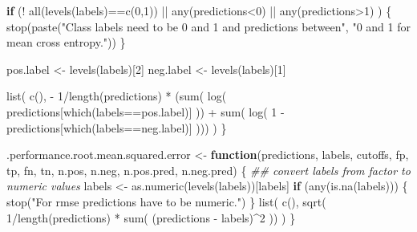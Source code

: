 \documentclass[
  letterpaper,
  DIV=11,
  numbers=noendperiod]{scrartcl}
\newenvironment{Shaded}{\begin{snugshade}}{\end{snugshade}}
\newcommand{\ControlFlowTok}[1]{\textcolor[rgb]{0.00,0.23,0.31}{\textbf{#1}}}
\newcommand{\DecValTok}[1]{\textcolor[rgb]{0.68,0.00,0.00}{#1}}
\newcommand{\DocumentationTok}[1]{\textcolor[rgb]{0.37,0.37,0.37}{\textit{#1}}}
\newcommand{\FunctionTok}[1]{\textcolor[rgb]{0.28,0.35,0.67}{#1}}
\newcommand{\NormalTok}[1]{\textcolor[rgb]{0.00,0.23,0.31}{#1}}
\newcommand{\OtherTok}[1]{\textcolor[rgb]{0.00,0.23,0.31}{#1}}
\newcommand{\SpecialCharTok}[1]{\textcolor[rgb]{0.37,0.37,0.37}{#1}}
\newcommand{\StringTok}[1]{\textcolor[rgb]{0.13,0.47,0.30}{#1}}
\begin{document}
\begin{Shaded}
\begin{Highlighting}[]
      \ControlFlowTok{if}\NormalTok{ (}\SpecialCharTok{!} \FunctionTok{all}\NormalTok{(}\FunctionTok{levels}\NormalTok{(labels)}\SpecialCharTok{==}\FunctionTok{c}\NormalTok{(}\DecValTok{0}\NormalTok{,}\DecValTok{1}\NormalTok{)) }\SpecialCharTok{||}
          \FunctionTok{any}\NormalTok{(predictions}\SpecialCharTok{\textless{}}\DecValTok{0}\NormalTok{) }\SpecialCharTok{||} \FunctionTok{any}\NormalTok{(predictions}\SpecialCharTok{\textgreater{}}\DecValTok{1}\NormalTok{) ) \{}
          \FunctionTok{stop}\NormalTok{(}\FunctionTok{paste}\NormalTok{(}\StringTok{"Class labels need to be 0 and 1 and predictions between"}\NormalTok{,}
                     \StringTok{"0 and 1 for mean cross entropy."}\NormalTok{))}
\NormalTok{      \}}
      
\NormalTok{      pos.label }\OtherTok{\textless{}{-}} \FunctionTok{levels}\NormalTok{(labels)[}\DecValTok{2}\NormalTok{]}
\NormalTok{      neg.label }\OtherTok{\textless{}{-}} \FunctionTok{levels}\NormalTok{(labels)[}\DecValTok{1}\NormalTok{]}
    
      \FunctionTok{list}\NormalTok{( }\FunctionTok{c}\NormalTok{(), }\SpecialCharTok{{-}} \DecValTok{1}\SpecialCharTok{/}\FunctionTok{length}\NormalTok{(predictions) }\SpecialCharTok{*}
\NormalTok{           (}\FunctionTok{sum}\NormalTok{( }\FunctionTok{log}\NormalTok{( predictions[}\FunctionTok{which}\NormalTok{(labels}\SpecialCharTok{==}\NormalTok{pos.label)] ))  }\SpecialCharTok{+}
            \FunctionTok{sum}\NormalTok{( }\FunctionTok{log}\NormalTok{( }\DecValTok{1} \SpecialCharTok{{-}}\NormalTok{ predictions[}\FunctionTok{which}\NormalTok{(labels}\SpecialCharTok{==}\NormalTok{neg.label)] ))) )}
\NormalTok{  \}}


\NormalTok{.performance.root.mean.squared.error }\OtherTok{\textless{}{-}}
  \ControlFlowTok{function}\NormalTok{(predictions, labels, cutoffs, fp, tp, fn, tn,}
\NormalTok{           n.pos, n.neg, n.pos.pred, n.neg.pred) \{}
      \DocumentationTok{\#\# convert labels from factor to numeric values}
\NormalTok{      labels }\OtherTok{\textless{}{-}} \FunctionTok{as.numeric}\NormalTok{(}\FunctionTok{levels}\NormalTok{(labels))[labels]}
      \ControlFlowTok{if}\NormalTok{ (}\FunctionTok{any}\NormalTok{(}\FunctionTok{is.na}\NormalTok{(labels))) \{}
          \FunctionTok{stop}\NormalTok{(}\StringTok{"For rmse predictions have to be numeric."}\NormalTok{)}
\NormalTok{      \}}
      \FunctionTok{list}\NormalTok{( }\FunctionTok{c}\NormalTok{(),  }\FunctionTok{sqrt}\NormalTok{( }\DecValTok{1}\SpecialCharTok{/}\FunctionTok{length}\NormalTok{(predictions) }\SpecialCharTok{*}
                      \FunctionTok{sum}\NormalTok{( (predictions }\SpecialCharTok{{-}}\NormalTok{ labels)}\SpecialCharTok{\^{}}\DecValTok{2}\NormalTok{ ))  )}
\NormalTok{  \}}


\end{Highlighting}
\end{Shaded}
\end{document}
